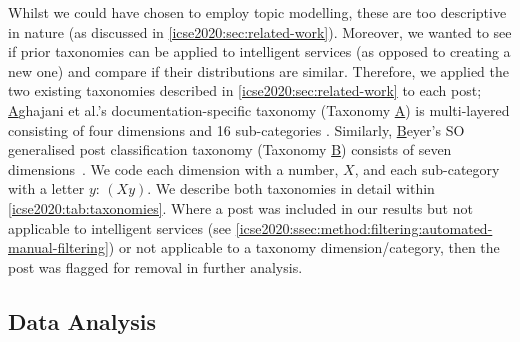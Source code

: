 Whilst we could have chosen to employ topic modelling, these are too descriptive in nature (as discussed in \cref{icse2020:sec:related-work}). Moreover, we wanted to see if prior taxonomies can be applied to intelligent services (as opposed to creating a new one) and compare if their distributions are similar. 
Therefore, we applied the two existing taxonomies described in \cref{icse2020:sec:related-work} to each post; 
\underline{A}ghajani et al.'s documentation-specific taxonomy (Taxonomy \underline{A}) is multi-layered consisting of four dimensions and 16 sub-categories \citep{Aghajani:2019bo}. Similarly, \underline{B}eyer's SO generalised post classification taxonomy (Taxonomy \underline{B}) consists of seven dimensions~\citep{Beyer:2018fm}. We code each dimension with a number, $X$, and each sub-category with a letter $y$: $(Xy)$. We describe both taxonomies in detail within \cref{icse2020:tab:taxonomies}. Where a post was included in our results but not applicable to intelligent services (see \cref{icse2020:ssec:method:filtering:automated-manual-filtering}) or not applicable to a taxonomy dimension/category, then the post was flagged for removal in further analysis.

\begin{landscape}

\end{landscape}

\subsection{Data Analysis}

